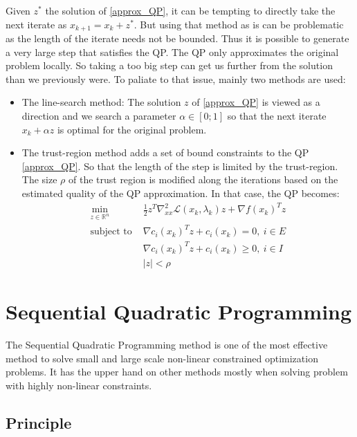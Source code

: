 Given $z^*$ the solution of \ref{approx_QP}, it can be tempting to directly take the next iterate as $x_{k+1} = x_k + z^*$.
But using that method as is can be problematic as the length of the iterate needs not be bounded.
Thus it is possible to generate a very large step that satisfies the QP.
The QP only approximates the original problem locally.
So taking a too big step can get us further from the solution than we previously were.
To paliate to that issue, mainly two methods are used:
\begin{itemize}
  \item The line-search method: The solution $z$ of \ref{approx_QP} is viewed as a direction and we search a parameter $\alpha\in [0;1]$ so that the next iterate $x_k + \alpha z$ is optimal for the original problem.
  \item The trust-region method adds a set of bound constraints to the QP \ref{approx_QP}. So that the length of the step is limited by the trust-region. The size $\rho$ of the trust region is modified along the iterations based on the estimated quality of the QP approximation. In that case, the QP becomes:
\begin{equation}
  \label{approx_QP_TR}
  \begin{array}{ll}
    \min\limits_{z\in \mathbb{R}^n}{} & \frac{1}{2}z^T\nabla_{xx}^2\mathcal{L}(x_k, \lambda_k)z + \nabla f(x_k)^Tz \\
    \text{subject to } & \nabla c_i(x_k)^Tz+c_i(x_k)=0,\ i\in E \\
                       & \nabla c_i(x_k)^Tz+c_i(x_k)\geq 0,\ i\in I\\
                       & |z|<\rho
  \end{array}
\end{equation}
\end{itemize}

\section{Sequential Quadratic Programming}
\label{sec:sequential_quadratic_programming}

The Sequential Quadratic Programming method is one of the most effective method to solve small and large scale non-linear constrained optimization problems.
It has the upper hand on other methods mostly when solving problem with highly non-linear constraints.

\subsection{Principle}
\label{sub:principle}


